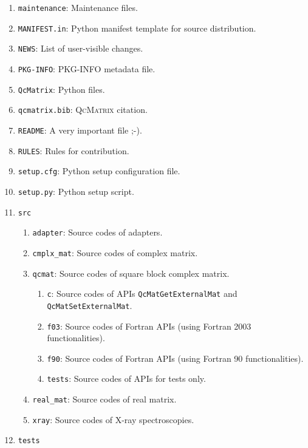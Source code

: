 \documentclass[a4paper,11pt,twoside,openright]{book}
\begin{document}
\begin{enumerate}
  \item {\color{blue}\verb|maintenance|}: Maintenance files.
  \item \verb|MANIFEST.in|: Python manifest template for source distribution.
  \item \verb|NEWS|: List of user-visible changes.
  \item \verb|PKG-INFO|: PKG-INFO metadata file.
  \item {\color{blue}\verb|QcMatrix|}: Python files.
  \item \verb|qcmatrix.bib|: \textsc{QcMatrix} citation.
  \item \verb|README|: A very important file ;-).
  \item \verb|RULES|: Rules for contribution.
  \item \verb|setup.cfg|: Python setup configuration file.
  \item {\color{green}\verb|setup.py|}: Python setup script.
  \item {\color{blue}\verb|src|}
    \begin{enumerate}
      \item {\color{blue}\verb|adapter|}: Source codes of adapters.
      \item {\color{blue}\verb|cmplx_mat|}: Source codes of complex matrix.
      \item {\color{blue}\verb|qcmat|}: Source codes of square block complex matrix.
        \begin{enumerate}
          \item {\color{blue}\verb|c|}: Source codes of APIs \verb|QcMatGetExternalMat| %
            and \verb|QcMatSetExternalMat|.
          \item {\color{blue}\verb|f03|}: Source codes of Fortran APIs (using
            Fortran 2003 functionalities).
          \item {\color{blue}\verb|f90|}: Source codes of Fortran APIs (using
            Fortran 90 functionalities).
          \item {\color{blue}\verb|tests|}:  Source codes of APIs for tests only.
        \end{enumerate}
      \item {\color{blue}\verb|real_mat|}: Source codes of real matrix.
      \item {\color{blue}\verb|xray|}: Source codes of X-ray spectroscopies.
    \end{enumerate}
  \item {\color{blue}\verb|tests|}
    \begin{enumerate}

\end{enumerate}
\end{enumerate}
\end{document}
